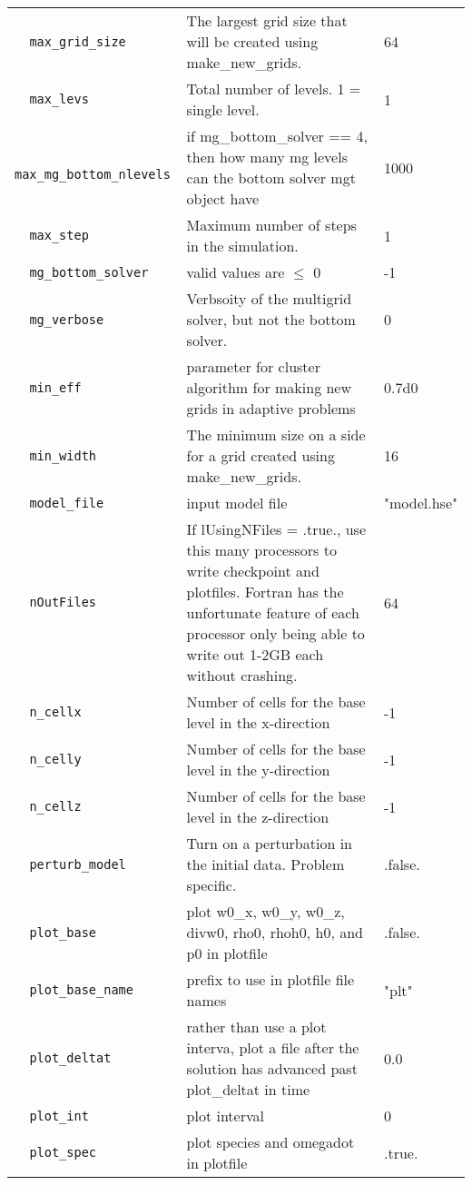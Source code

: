 {\begin{center}
\begin{longtable}{|l|p{3.25in}|l|}
\verb=  max_grid_size  = &    The largest grid size that will be created using make\_new\_grids.  &  64 \\
\verb=  max_levs  = &   Total number of levels.  1 = single level.  &  1 \\
\verb=  max_mg_bottom_nlevels  = &   if mg\_bottom\_solver == 4, then how many mg levels can the bottom solver mgt object have  &  1000 \\
\verb=  max_step  = &   Maximum number of steps in the simulation.  &  1 \\
\verb=  mg_bottom_solver  = &   valid values are $\le$ 0  &  -1 \\
\verb=  mg_verbose  = &   Verbsoity of the multigrid solver, but not the bottom solver.  &  0 \\
\verb=  min_eff  = &   parameter for cluster algorithm for making new grids in adaptive problems  &  0.7d0 \\
\verb=  min_width  = &   The minimum size on a side for a grid created using make\_new\_grids.  &  16 \\
\verb=  model_file  = &   input model file  &  "model.hse" \\
\verb=  nOutFiles  = &   If lUsingNFiles = .true., use this many processors to write checkpoint and plotfiles.  Fortran has the unfortunate feature of each processor only being able to write out 1-2GB each without crashing.  &  64 \\
\verb=  n_cellx  = &   Number of cells for the base level in the x-direction  &  -1 \\
\verb=  n_celly  = &   Number of cells for the base level in the y-direction  &  -1 \\
\verb=  n_cellz  = &   Number of cells for the base level in the z-direction  &  -1 \\
\verb=  perturb_model  = &   Turn on a perturbation in the initial data.  Problem specific.  &  .false. \\
\verb=  plot_base  = &   plot w0\_x, w0\_y, w0\_z, divw0, rho0, rhoh0, h0, and p0 in plotfile  &  .false. \\
\verb=  plot_base_name  = &   prefix to use in plotfile file names  &  "plt" \\
\verb=  plot_deltat  = &   rather than use a plot interva, plot a file after the solution has advanced past plot\_deltat in time  &  0.0 \\
\verb=  plot_int  = &   plot interval  &  0 \\
\verb=  plot_spec  = &   plot species and omegadot in plotfile  &  .true. \\

\end{longtable}
\end{center}}

